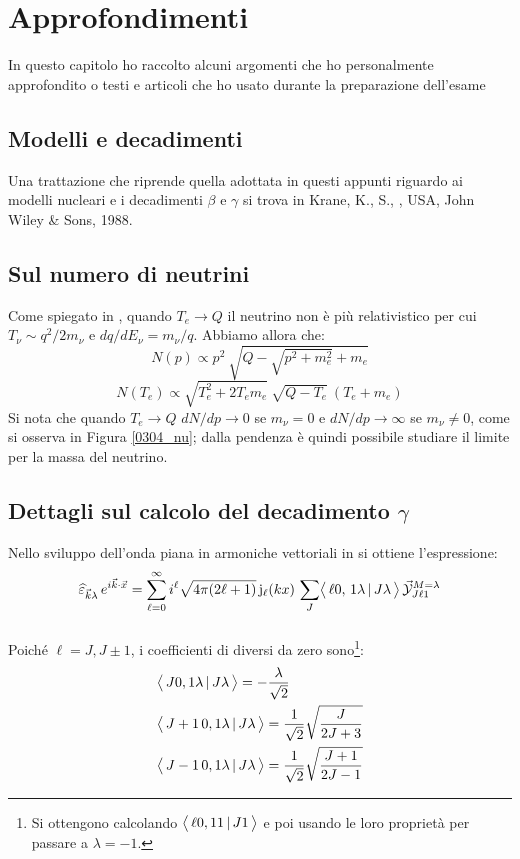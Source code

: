 
\chapter{Approfondimenti}\label{complementi}

In questo capitolo ho raccolto alcuni argomenti che ho personalmente approfondito o testi e articoli che ho usato durante la preparazione dell'esame 

\section{Modelli e decadimenti}\label{compl-krane}
Una trattazione che riprende quella adottata in questi appunti riguardo ai modelli nucleari e i decadimenti $\beta$ e $\gamma$ si trova in Krane, K., S., \textit{}, USA, John Wiley \& Sons, 1988.

\section{Sul numero di neutrini}\label{compl-neutrini}
Come spiegato in , quando $T_e \to Q$ il neutrino non è più relativistico per cui $T_\nu\sim q^2/2m_\nu$ e $dq/dE_\nu = m_\nu/q$. Abbiamo allora che:
$$N(p)\propto p^2 \: \sqrt{Q-\sqrt{p^2+m_e^2} + m_e}$$ 
$$N(T_e)\propto \sqrt{T_e^2+2T_em_e} \: \sqrt{Q-T_e} \: (T_e+m_e)$$
Si nota che quando $T_e\to Q$ $dN/dp\to 0$ se $m_\nu = 0$ e $dN/dp\to \infty$ se $m_\nu \not = 0$, come si osserva in Figura \ref{0304_nu}; dalla pendenza è quindi possibile studiare il limite per la massa del neutrino.

\section{Dettagli sul calcolo del decadimento $\gamma$}\label{compl-passaggi}
Nello sviluppo dell'onda piana in armoniche vettoriali in  si ottiene l'espressione:
$$\widehat{\varepsilon}_{\vec{k}\lambda}\, e^{i\vec{k}\cdot\vec{x}} = \sum_{\ell=0}^\infty i^\ell \sqrt{4\pi(2\ell+1)}\, \mathrm{j}_\ell (kx) \, \sum_J \bigl\langle\, \ell 0 ,\, 1\lambda\, |\, J\lambda\, \bigr\rangle\, \vec{\mathcal{Y}}^{M=\lambda}_{J\ell 1}$$
\subsection{\CG}
Poiché $\ell = J, J\pm 1$, i coefficienti di \CG diversi da zero sono\footnote{Si ottengono calcolando $\bigl\langle\, \ell 0, 1 1\, |\, J1\, \bigr\rangle$ e poi usando le loro proprietà per passare a $\lambda = -1$.}:
\begin{align*}
	&\bigl\langle\, J0,1\lambda\, |\, J\lambda\, \bigr\rangle = - \frac{\lambda}{\sqrt{2}}\\
	&\bigl\langle\, J+1\,0,1\lambda\, |\, J\lambda\, \bigr\rangle = \frac{1}{\sqrt{2}} \sqrt{\frac{J}{2J+3}}\\
	&\bigl\langle\, J-1\,0,1\lambda\, |\, J\lambda\, \bigr\rangle = \frac{1}{\sqrt{2}} \sqrt{\frac{J+1}{2J-1}}
\end{align*}
